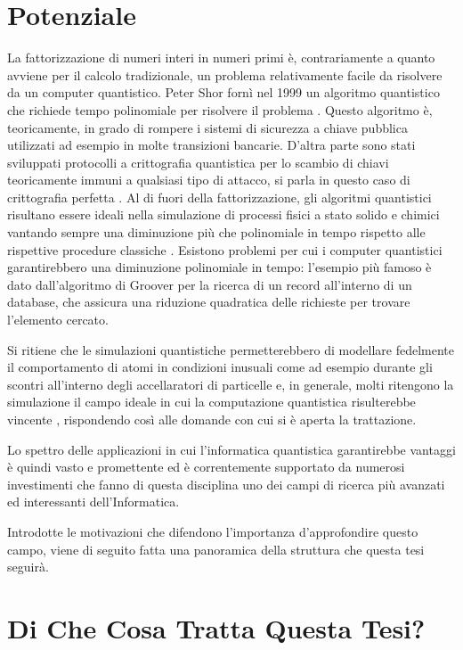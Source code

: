 \documentclass[12pt,a4paper,openright]{report}
\begin{document}
\section{Potenziale}
La fattorizzazione di numeri interi in numeri primi è, contrariamente a quanto avviene per il calcolo tradizionale, un problema relativamente facile da risolvere da un computer quantistico.
Peter Shor fornì nel 1999 un algoritmo quantistico che richiede tempo polinomiale per risolvere il problema \cite{ref25}. Questo algoritmo è, teoricamente, in grado di rompere i sistemi di sicurezza a
chiave pubblica utilizzati ad esempio in molte transizioni bancarie. D'altra parte sono stati sviluppati protocolli a crittografia quantistica per lo scambio di chiavi teoricamente immuni a qualsiasi tipo di 
attacco, si parla in questo caso di crittografia perfetta \cite{ref26}. Al di fuori della fattorizzazione, gli algoritmi quantistici risultano essere ideali nella simulazione di processi fisici a stato solido e chimici
vantando sempre una diminuzione più che polinomiale in tempo rispetto alle rispettive procedure classiche \cite{ref27}. Esistono problemi per cui i computer quantistici garantirebbero una diminuzione polinomiale 
in tempo: l'esempio più famoso è dato dall'algoritmo di Groover \cite{ref28} per la ricerca di un record all'interno di un database, che assicura una riduzione quadratica delle richieste per trovare l'elemento cercato.\par
Si ritiene che le simulazioni quantistiche permetterebbero di modellare fedelmente il comportamento di atomi in condizioni inusuali come ad esempio durante gli scontri all'interno degli accellaratori di particelle \cite{ref29} e,
in generale, molti ritengono la simulazione il campo ideale in cui la computazione quantistica risulterebbe vincente \cite{ref30}, rispondendo così alle domande con cui si è aperta la trattazione.\par
Lo spettro delle applicazioni in cui l'informatica quantistica garantirebbe vantaggi è quindi vasto e promettente ed è correntemente supportato da numerosi investimenti che fanno di questa disciplina uno dei 
campi di ricerca più avanzati ed interessanti dell'Informatica.\par
Introdotte le motivazioni che difendono l'importanza d'approfondire questo campo, viene di seguito fatta una panoramica della struttura che questa tesi seguirà.

\section{Di Che Cosa Tratta Questa Tesi?}
\end{document}
